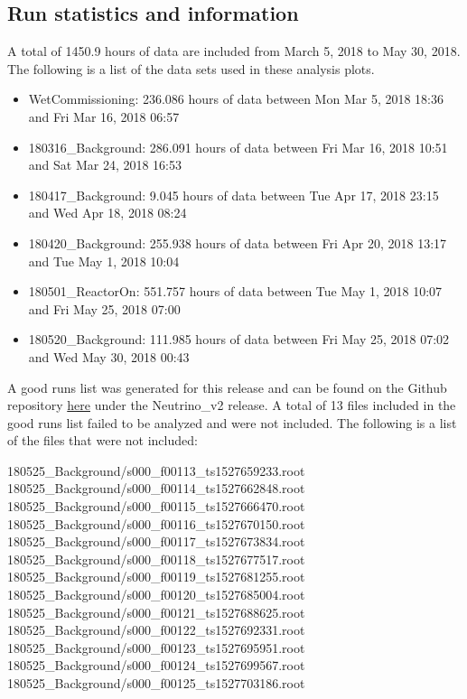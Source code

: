 \subsection{Run statistics and information}
A total of 1450.9 hours of data are included from March 5, 2018 to May 30, 2018. The following is a list of the data sets used in these analysis plots. 
\begin{itemize}
\item{WetCommissioning: 236.086 hours of data between Mon Mar 5, 2018 18:36 and Fri Mar 16, 2018 06:57}
\item{180316\_Background: 286.091 hours of data between Fri Mar 16, 2018 10:51 and Sat Mar 24, 2018 16:53}
\item{180417\_Background: 9.045 hours of data between Tue Apr 17, 2018 23:15 and Wed Apr 18, 2018 08:24}
\item{180420\_Background: 255.938 hours of data between Fri Apr 20, 2018 13:17 and Tue May 1, 2018 10:04}
\item{180501\_ReactorOn: 551.757 hours of data between Tue May 1, 2018 10:07 and Fri May 25, 2018 07:00}
\item{180520\_Background: 111.985 hours of data between Fri May 25, 2018 07:02 and Wed May 30, 2018 00:43}
\end{itemize}
A good runs list was generated for this release and can be found on the Github repository  \href{https://github.com/PROSPECT-collaboration/PROSPECT2x_Analysis/tree/master/Analysis/AnalyzerConfig/Neutrino18_GoodRuns.txt}{here} under the Neutrino\_v2 release. A total of 13 files included in the good runs list failed to be analyzed and were not included. The following is a list of the files that were not included:
\begin{center}
180525\_Background/s000\_f00113\_ts1527659233.root\\ 
180525\_Background/s000\_f00114\_ts1527662848.root\\
180525\_Background/s000\_f00115\_ts1527666470.root\\ 
180525\_Background/s000\_f00116\_ts1527670150.root\\ 
180525\_Background/s000\_f00117\_ts1527673834.root\\
180525\_Background/s000\_f00118\_ts1527677517.root\\ 
180525\_Background/s000\_f00119\_ts1527681255.root\\ 
180525\_Background/s000\_f00120\_ts1527685004.root\\
180525\_Background/s000\_f00121\_ts1527688625.root\\
180525\_Background/s000\_f00122\_ts1527692331.root\\ 
180525\_Background/s000\_f00123\_ts1527695951.root\\ 
180525\_Background/s000\_f00124\_ts1527699567.root\\ 
180525\_Background/s000\_f00125\_ts1527703186.root\\
\end{center}
